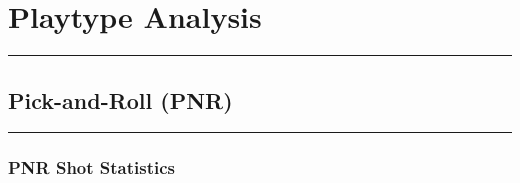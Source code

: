 \documentclass[a4paper,12pt]{article}
\begin{document}
\newpage
\section{Playtype Analysis}

\vspace{1em} %
\hrule height 1pt width 1\textwidth %
\vspace{1em} %

\subsection{Pick-and-Roll (PNR)}

\vspace{1em} %
\hrule height 1pt width 1\textwidth %
\vspace{0em} %

\subsubsection{PNR Shot Statistics}
\end{document}
